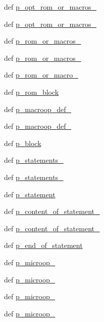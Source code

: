 \begin{DoxyCompactItemize}
def \hyperlink{namespacemicro__asm_a428b8086af1d1528aff7252fa2990344}{p\_\-opt\_\-rom\_\-or\_\-macros\_}
\item 
def \hyperlink{namespacemicro__asm_af9fedecba85a450dedbeba1844439c48}{p\_\-opt\_\-rom\_\-or\_\-macros\_}
\item 
def \hyperlink{namespacemicro__asm_a964484247cb0adbfa617df2dc18412f9}{p\_\-rom\_\-or\_\-macros\_}
\item 
def \hyperlink{namespacemicro__asm_a98a28e21d8935d0509b0eeab16cb1054}{p\_\-rom\_\-or\_\-macros\_}
\item 
def \hyperlink{namespacemicro__asm_a1074e10937aa3b2c8c2a43b95ecb89bc}{p\_\-rom\_\-or\_\-macro\_}
\item 
def \hyperlink{namespacemicro__asm_a85628206b0efb164296ad31d33c4e6c1}{p\_\-rom\_\-block}
\item 
def \hyperlink{namespacemicro__asm_aa06e96f1559d9d801fc212792e8b6f9a}{p\_\-macroop\_\-def\_}
\item 
def \hyperlink{namespacemicro__asm_a6d0e75a8c27d4a8f7e9bd8d1e20459b6}{p\_\-macroop\_\-def\_}
\item 
def \hyperlink{namespacemicro__asm_a02f1dabdaa8180367d76047e8d85ecfb}{p\_\-block}
\item 
def \hyperlink{namespacemicro__asm_a6cd716f332ee4919811fe6ade94e75c5}{p\_\-statements\_}
\item 
def \hyperlink{namespacemicro__asm_a33c1a47687c46c90cb9435de8cb17c32}{p\_\-statements\_}
\item 
def \hyperlink{namespacemicro__asm_aa6bc8ecb9428878bec6bcc95b1cb0f4c}{p\_\-statement}
\item 
def \hyperlink{namespacemicro__asm_a3e7c407b8a54e83439195cad9357af30}{p\_\-content\_\-of\_\-statement\_}
\item 
def \hyperlink{namespacemicro__asm_a84b621725f0a85e7f52bfaeb974fedb7}{p\_\-content\_\-of\_\-statement\_}
\item 
def \hyperlink{namespacemicro__asm_af9a07c99f70584eecf19c3bfc4fb8e26}{p\_\-end\_\-of\_\-statement}
\item 
def \hyperlink{namespacemicro__asm_a0f05ebd0fd8134f90eab4087d7e71fb2}{p\_\-microop\_}
\item 
def \hyperlink{namespacemicro__asm_aabbc3564c9f11e69915460e13e307b07}{p\_\-microop\_}
\item 
def \hyperlink{namespacemicro__asm_a3bf613ee79e6c58586b467556274fc84}{p\_\-microop\_}
\item 
def \hyperlink{namespacemicro__asm_a86065607f7f81cdbb6bbf1375e32c2c2}{p\_\-microop\_}

\end{DoxyCompactItemize}
